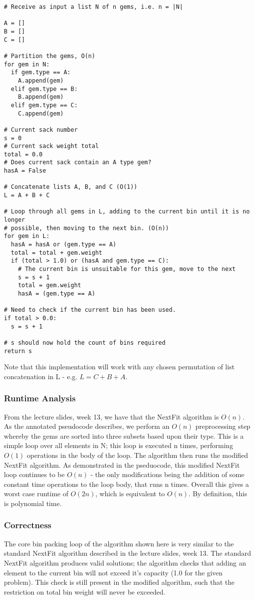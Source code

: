\documentclass[paper=a4, fontsize=12pt]{article}
\begin{document}
\begin{lstlisting}
# Receive as input a list N of n gems, i.e. n = |N|

A = []
B = []
C = []

# Partition the gems, O(n)
for gem in N:
  if gem.type == A:
    A.append(gem)
  elif gem.type == B:
    B.append(gem)
  elif gem.type == C:
    C.append(gem)

# Current sack number
s = 0
# Current sack weight total
total = 0.0
# Does current sack contain an A type gem?
hasA = False

# Concatenate lists A, B, and C (O(1))
L = A + B + C

# Loop through all gems in L, adding to the current bin until it is no longer
# possible, then moving to the next bin. (O(n))
for gem in L:
  hasA = hasA or (gem.type == A)
  total = total + gem.weight
  if (total > 1.0) or (hasA and gem.type == C):
    # The current bin is unsuitable for this gem, move to the next
    s = s + 1
    total = gem.weight
    hasA = (gem.type == A)

# Need to check if the current bin has been used.
if total > 0.0:
  s = s + 1

# s should now hold the count of bins required
return s
\end{lstlisting}

Note that this implementation will work with any chosen permutation of list
concatenation in L - e.g. \(L = C + B + A\).

\subsubsection{Runtime Analysis}
From the lecture slides, week 13, we have that the NextFit algorithm is
\(O(n)\). As the annotated pseudocode describes, we perform an \(O(n)\)
preprocessing step whereby the gems are sorted into three subsets based upon
their type. This is a simple loop over all elements in N; this loop is executed
n times, performing \(O(1)\) operations in the body of the loop. The algorithm
then runs the modified NextFit algorithm. As demonstrated in the pseduocode,
this modified NextFit loop continues to be \(O(n)\) - the only modifications
being the addition of some constant time operations to the loop body, that runs
n times. Overall this gives a worst case runtime of \(O(2n)\), which is
equivalent to \(O(n)\). By definition, this is polynomial time.

\subsubsection{Correctness}
The core bin packing loop of the algorithm shown here is very similar to the
standard NextFit algorithm described in the lecture slides, week 13. The
standard NextFit algorithm produces valid solutions; the algorithm checks that
adding an element to the current bin will not exceed it's capacity (1.0 for the
given problem). This check is still present in the modified algorithm, such
that the restriction on total bin weight will never be exceeded.
\end{document}
